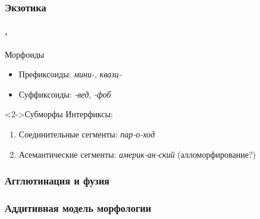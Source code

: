 \begin{frame}
    \frametitle{Экзотика}
    \framesubtitle{\autocite[91--97]{plungyan:2003}, \autocite[15, 102]{zubova_menshikova:2014}}

    \begin{block}{Морфоиды}
        \begin{itemize}
            \item Префиксоиды: \textit{мини-}, \textit{квази-}
            \item Суффиксоиды: \textit{-вед}, \textit{-фоб}
        \end{itemize}
    \end{block}

    \begin{block}<2->{Субморфы}
        Интерфиксы: \begin{enumerate}
            \item Соединительные сегменты: \textit{пар-о-ход}
            \item Асемантические сегменты: \textit{америк-ан-ский} (алломорфирование?)
        \end{enumerate}
    \end{block}
\end{frame}

\begin{frame}
    \frametitle{Агглютинация и фузия}
\end{frame}

\begin{frame}
    \frametitle{Аддитивная модель морфологии}
\end{frame}
